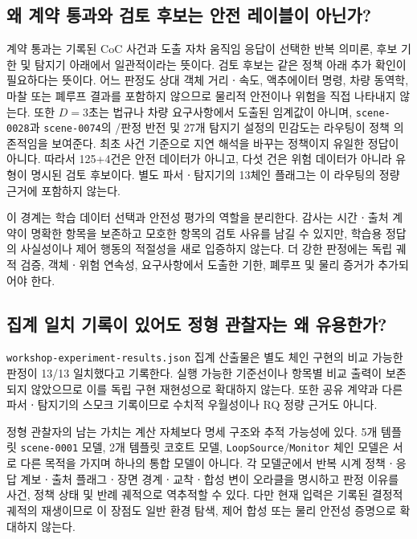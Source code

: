 \subsection{왜 계약 통과와 검토 후보는 안전 레이블이 아닌가?}

계약 통과는 기록된 CoC 사건과 도출 자차 움직임 응답이 선택한 반복 의미론, 후보 기한 및 탐지기 아래에서 일관적이라는 뜻이다. 검토 후보는 같은 정책 아래 추가 확인이 필요하다는 뜻이다. 어느 판정도 상대 객체 거리ㆍ속도, 액추에이터 명령, 차량 동역학, 마찰 또는 폐루프 결과를 포함하지 않으므로 물리적 안전이나 위험을 직접 나타내지 않는다. 또한 $D=3$초는 법규나 차량 요구사항에서 도출된 임계값이 아니며, \texttt{scene-0028}과 \texttt{scene-0074}의 \preserve/\reset 판정 반전 및 27개 탐지기 설정의 민감도는 라우팅이 정책 의존적임을 보여준다.  최초 사건 기준으로 지연 해석을 바꾸는 정책이지 유일한 정답이 아니다. 따라서 125+4건은 안전 데이터가 아니고, 다섯 건은 위험 데이터가 아니라 유형이 명시된 검토 후보이다. 별도 파서ㆍ탐지기의 13체인 플래그는 이 라우팅의 정량 근거에 포함하지 않는다.

이 경계는 학습 데이터 선택과 안전성 평가의 역할을 분리한다. 감사는 시간ㆍ출처 계약이 명확한 항목을 보존하고 모호한 항목의 검토 사유를 남길 수 있지만, 학습용 정답의 사실성이나 제어 행동의 적절성을 새로 입증하지 않는다. 더 강한 판정에는 독립 궤적 검증, 객체ㆍ위험 연속성, 요구사항에서 도출한 기한, 폐루프 및 물리 증거가 추가되어야 한다.

\subsection{집계 일치 기록이 있어도 정형 관찰자는 왜 유용한가?}

\texttt{workshop-experiment-results.json} 집계 산출물은 별도 체인 구현의 비교 가능한 판정이 13/13 일치했다고 기록한다. 실행 가능한 기준선이나 항목별 비교 출력이 보존되지 않았으므로 이를 독립 구현 재현성으로 확대하지 않는다. 또한 공유 계약과 다른 파서ㆍ탐지기의 스모크 기록이므로  수치적 우월성이나 RQ 정량 근거도 아니다.

정형 관찰자의 남는 가치는 계산 자체보다 명세 구조와 추적 가능성에 있다. 5개 템플릿 \texttt{scene-0001} 모델, 2개 템플릿 코호트 모델, \texttt{LoopSource}/\texttt{Monitor} 체인 모델은 서로 다른 목적을 가지며 하나의 통합 모델이 아니다. 각 모델군에서 반복 시계 정책ㆍ응답 계보ㆍ출처 플래그ㆍ장면 경계ㆍ교착ㆍ합성 변이 오라클을 명시하고 판정 이유를 사건, 정책 상태 및 반례 궤적으로 역추적할 수 있다. 다만 현재 입력은 기록된 결정적 궤적의 재생이므로 이 장점도 일반 환경 탐색, 제어 합성 또는 물리 안전성 증명으로 확대하지 않는다.
